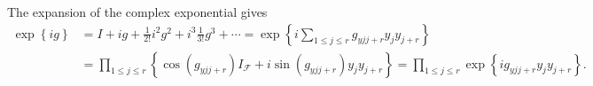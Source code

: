 \documentclass[aps,preprint]{revtex4}%
\begin{document}
The expansion of the complex exponential gives
\begin{align}
\exp\left\{  ig\right\}   &  =I+ig+\frac{1}{2!}i^{2}g^{2}+i^{3}\frac{1}%
{3!}g^{3}+\cdots=\exp\left\{  i%
{\textstyle\sum\limits_{1\leq j\leq r}}
\mathit{g}_{yjj+r}y_{j}y_{j+r}\right\}  \\
&  =%
{\textstyle\prod\limits_{1\leq j\leq r}}
\left\{  \cos\left(  \mathit{g}_{yjj+r}\right)  I_{\mathcal{F}}+i\sin\left(
\mathit{g}_{yjj+r}\right)  y_{j}y_{j+r}\right\}  =%
{\textstyle\prod\limits_{1\leq j\leq r}}
\exp\left\{  i\mathit{g}_{yjj+r}y_{j}y_{j+r}\right\}  .
\end{align}
\end{document}
